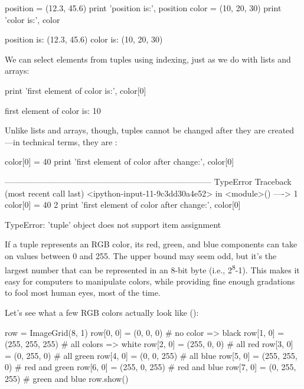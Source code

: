 \begin{VerbIn}
position = (12.3, 45.6)
print 'position is:', position
color = (10, 20, 30)
print 'color is:', color
\end{VerbIn}

\begin{VerbOut}
position is: (12.3, 45.6)
color is: (10, 20, 30)
\end{VerbOut}

We can select elements from tuples using indexing, just as we do with
lists and arrays:

\begin{VerbIn}
print 'first element of color is:', color[0]
\end{VerbIn}

\begin{VerbOut}
first element of color is: 10
\end{VerbOut}

Unlike lists and arrays, though, tuples cannot be changed after they are
created---in technical terms, they are
:

\begin{VerbIn}
color[0] = 40
print 'first element of color after change:', color[0]
\end{VerbIn}

\begin{VerbErr}
---------------------------------------------------------------------------
TypeError                                 Traceback (most recent call last)
<ipython-input-11-9c3dd30a4e52> in <module>()
----> 1 color[0] = 40
      2 print 'first element of color after change:', color[0]

TypeError: 'tuple' object does not support item assignment
\end{VerbErr}

If a tuple represents an RGB color, its red, green, and blue components
can take on values between 0 and 255. The upper bound may seem odd, but
it's the largest number that can be represented in an 8-bit byte (i.e.,
2\textsuperscript{8}-1). This makes it easy for computers to manipulate
colors, while providing fine enough gradations to fool most human eyes,
most of the time.

Let's see what a few RGB colors actually look like ():

\begin{VerbIn}
row = ImageGrid(8, 1)
row[0, 0] = (0, 0, 0)   # no color => black
row[1, 0] = (255, 255, 255) # all colors => white
row[2, 0] = (255, 0, 0) # all red
row[3, 0] = (0, 255, 0) # all green
row[4, 0] = (0, 0, 255) # all blue
row[5, 0] = (255, 255, 0) # red and green
row[6, 0] = (255, 0, 255) # red and blue
row[7, 0] = (0, 255, 255) # green and blue
row.show()
\end{VerbIn}

